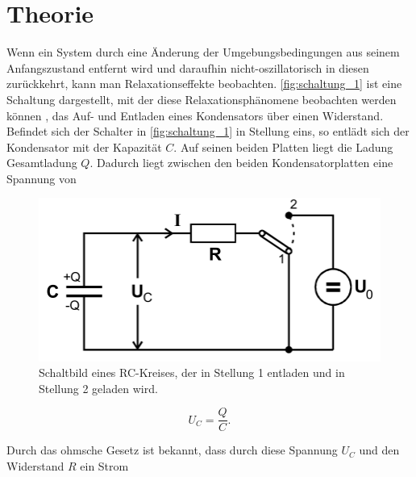 \section{Theorie}
\label{sec:Theorie}




Wenn ein System durch eine Änderung der Umgebungsbedingungen aus seinem Anfangszustand entfernt wird und daraufhin nicht-oszillatorisch in diesen zurückkehrt, kann man Relaxationseffekte beobachten. \autoref{fig:schaltung_1} ist eine Schaltung dargestellt, mit der diese Relaxationsphänomene beobachten werden können , das Auf- und Entladen eines Kondensators über einen Widerstand. 
Befindet sich der Schalter in \autoref{fig:schaltung_1} in Stellung eins, so entlädt sich der Kondensator mit der Kapazität $C$. Auf seinen beiden Platten liegt die Ladung Gesamtladung $Q$. Dadurch liegt zwischen den beiden Kondensatorplatten eine Spannung von 

\begin{figure}
    \centering
    \includegraphics[width=\textwidth/2]{images/schaltung_1.png}
    \caption{Schaltbild eines RC-Kreises, der in Stellung 1 entladen und in Stellung 2 geladen wird. \cite{V353}}
    \label{fig:schaltung_1}
\end{figure}

\begin{equation}
    \label{eq:kondensatorspannung}
    U_C = \frac{Q}{C}.
\end{equation}

Durch das ohmsche Gesetz ist bekannt, dass durch diese Spannung $U_C$ und den Widerstand $R$ ein Strom 

